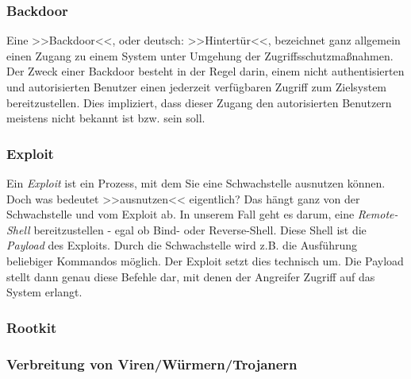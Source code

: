 \subsubsection{Backdoor}
\label{sec:Backdoor}

Eine >>Backdoor<<, oder deutsch: >>Hintertür<<, bezeichnet ganz allgemein einen Zugang zu einem System unter Umgehung der Zugriffsschutzmaßnahmen. Der Zweck einer Backdoor besteht in der Regel darin, einem nicht authentisierten und autorisierten Benutzer einen jederzeit verfügbaren Zugriff zum Zielsystem bereitzustellen. Dies impliziert, dass dieser Zugang den autorisierten Benutzern meistens nicht bekannt ist bzw. sein soll.


\subsubsection{Exploit}
\label{sec:Exploit}

Ein \textit{Exploit} ist ein Prozess, mit dem Sie eine Schwachstelle ausnutzen können. Doch was bedeutet >>ausnutzen<< eigentlich? Das hängt ganz von der Schwachstelle und vom Exploit ab. In unserem Fall geht es darum, eine \textit{Remote-Shell} bereitzustellen - egal ob Bind- oder Reverse-Shell. Diese Shell ist die \textit{Payload} des Exploits. Durch die Schwachstelle wird z.B. die Ausführung beliebiger Kommandos möglich. Der Exploit setzt dies technisch um. Die Payload stellt dann genau diese Befehle dar, mit denen der Angreifer Zugriff auf das System erlangt.

\subsubsection{Rootkit}
\label{sec:Rootkit}

\subsubsection{Verbreitung von Viren/Würmern/Trojanern}
\label{sec:VerbreitungVirenWuermerTrojaner}


